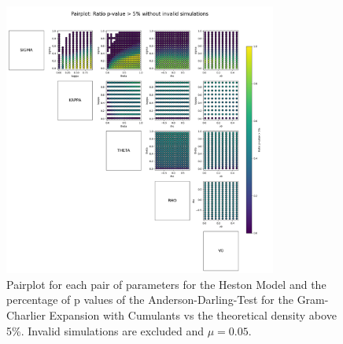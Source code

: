\begin{figure}
    \centering
    \includegraphics[width=0.8\textwidth]{img/pairplot_GC_cum_AD.png}
    \caption{Pairplot for each pair of parameters for the Heston Model and the percentage of p values of the Anderson-Darling-Test for the Gram-Charlier Expansion with Cumulants vs the theoretical density above 5\%. Invalid simulations are excluded and $\mu=0.05$.}
    \label{fig:pairplot_GC_cum_AD_mu005}
\end{figure}